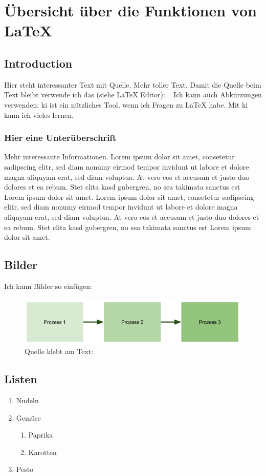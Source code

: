 \chapter{Übersicht über die Funktionen von LaTeX}

\section{Introduction}
Hier steht interessanter Text mit Quelle. \cite{example_citation}  Mehr toller Text. Damit die Quelle beim Text bleibt verwende ich das (siehe LaTeX Editor): ~\cite{example_citation} 
Ich kann auch Abkürzungen verwenden: \ac{ki} ist ein nützliches Tool, wenn ich Fragen zu LaTeX habe. Mit \ac{ki} kann ich vieles lernen.

\subsection{Hier eine Unterüberschrift}
Mehr interessante Informationen. Lorem ipsum dolor sit amet, consetetur sadipscing elitr, sed diam nonumy eirmod tempor invidunt ut labore et dolore magna aliquyam erat, sed diam voluptua. At vero eos et accusam et justo duo dolores et ea rebum. Stet clita kasd gubergren, no sea takimata sanctus est Lorem ipsum dolor sit amet. Lorem ipsum dolor sit amet, consetetur sadipscing elitr, sed diam nonumy eirmod tempor invidunt ut labore et dolore magna aliquyam erat, sed diam voluptua. At vero eos et accusam et justo duo dolores et ea rebum. Stet clita kasd gubergren, no sea takimata sanctus est Lorem ipsum dolor sit amet. 

\section{Bilder}

Ich kann Bilder so einfügen:
\begin{figure}[h]
    \centering
    \includegraphics[width=0.5\linewidth]{figures/Beispiel_Bild.png}
    \caption{Quelle klebt am Text: ~\cite{example_citation}}
    \label{fig:Beipsielbild}
\end{figure}



\section{Listen}
\begin{enumerate}[label=\arabic*.]
    \item Nudeln
    \item Gemüse
    \begin{enumerate}[label=\arabic{enumi}.\arabic*.]
        \item Paprika
        \item Karotten
    \end{enumerate}
    \item Pesto
\end{enumerate}

